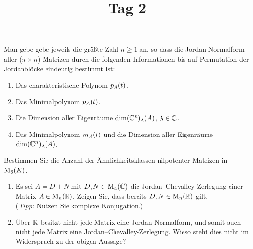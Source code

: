 \documentclass[a4paper, 10pt]{scrartcl}
\title{Tag 2}
\author{}
\date{}
\begin{document}
\begin{question}[subtitle = Bestimmtheit der Jordan-Normalform]
  Man gebe gebe jeweils die größte Zahl $n \geq 1$ an, so dass die Jordan-Normalform aller ($n \times n$)-Matrizen durch die folgenden Informationen bis auf Permutation der Jordanblöcke eindeutig bestimmt ist:
  \begin{enumerate}
    \item
      Das charakteristische Polynom $p_{A}(t)$.
    \item
      Das Minimalpolynom $p_{A}(t)$.
    \item
      Die Dimension aller Eigenräume $\dim (\mathbb{C}^n)_{\lambda}(A)$, $\lambda \in \mathbb{C}$.
    \item
      Das Minimalpolynom $m_{A}(t)$ und die Dimension aller Eigenräume $\dim (\mathbb{C}^n)_{\lambda}(A)$.
  \end{enumerate}
\end{question}










\begin{question}[subtitle = Ähnlichkeitsklassen nilpotenter Matrizen]
  Bestimmen Sie die Anzahl der Ähnlichkeitsklassen nilpotenter Matrizen in $\operatorname{M}_{6}(K)$.
\end{question}





\begin{question}[subtitle = Jordan--Chevalley-Zerlegung reeller Matrizen]
  \begin{enumerate}
    \item
      Es sei $A = D + N$ mit $D, N \in \operatorname{M}_{n}(\mathbb{C})$ die Jordan--Chevalley-Zerlegung einer Matrix $A \in \operatorname{M}_{n}(\mathbb{R})$.
      Zeigen Sie, dass bereits $D, N \in \operatorname{M}_{n}(\mathbb{R})$ gilt.
      \\
      (\emph{Tipp}:
       Nutzen Sie komplexe Konjugation.)
    \item
      Über $\mathbb{R}$ besitzt nicht jede Matrix eine Jordan-Normalform, und somit auch nicht jede Matrix eine Jordan--Chevalley-Zerlegung.
      Wieso steht dies nicht im Widerspruch zu der obigen Aussage?
  \end{enumerate}
\end{question}
\end{document}
